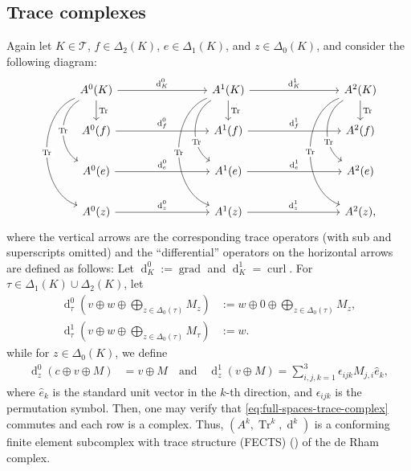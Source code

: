\documentclass{mcom-l}
\theoremstyle{definition}
\theoremstyle{remark}
\numberwithin{equation}{section}
\newcommand{\unitvec}[1]{\hat{#1}}
\DeclareMathOperator{\curl}{curl}
\DeclareMathOperator{\grad}{grad}
\DeclareMathOperator{\dee}{d}
\DeclareMathOperator{\Tr}{Tr}
\newcommand{\mesh}[0]{\mathcal{T}}
\begin{document}
\subsection{Trace complexes}

Again let $K \in \mesh$, $f \in \Delta_2(K)$, 
$e \in \Delta_1(K)$, and $z \in \Delta_0(K)$, and 
consider the following diagram:
\begin{equation}
	\label{eq:full-spaces-trace-complex}
	\begin{tikzcd}[ampersand replacement = \&, column sep = 8em]
		A^0(K) \arrow[r, "\dee_K^0"]
		\arrow[d, "\Tr"]
		\arrow[dd, bend right=60, "\Tr" description]
		\arrow[ddd, bend right=70, "\Tr" description]
		\& A^1(K) \arrow[r, "\dee_K^1"]
		\arrow[d, "\Tr"] 
		\& A^2(K) 
		\arrow[d, "\Tr"] \\
		A^0(f) \arrow[r, "\dee^{0}_{f}"]
		\& A^1(f) \arrow{r}{\dee^{1}_{f}} 
		\& A^2(f) \\
		A^0(e) \arrow{r}{\dee^{0}_{e}}
		\& A^1(e) \arrow{r}{\dee^{1}_{e}} 
		\arrow[from=uu, bend right=60, "\Tr" description, 
		pos=0.66]
		\& A^2(e)
		\arrow[from=uu, bend right=60, "\Tr" description,
		pos=0.66] \\
		A^0(z) \arrow{r}{\dee^{0}_{z}}
		\& A^1(z) \arrow{r}{\dee^{1}_{z}}
		\arrow[from=uuu, bend right=70, "\Tr" description]
		\& A^2(z),
		\arrow[from=uuu, bend right=70, "\Tr" description]
	\end{tikzcd}
\end{equation}
where the vertical arrows are the corresponding trace operators 
(with sub and superscripts omitted) and 
the ``differential'' operators on the horizontal arrows are defined 
as follows: Let $\dee^0_K := \grad$ and $\dee^1_K = \curl$.
For $\tau \in \Delta_1(K) \cup \Delta_2(K)$, let
\begin{align*}
	\dee_{\tau}^0 \left( v \oplus w 
	\oplus \bigoplus_{z \in \Delta_0(\tau)} M_z \right)
	&:= w \oplus 0 
	\oplus \bigoplus_{z \in \Delta_0(\tau)} M_z, \\
	\dee_{\tau}^1 \left( v \oplus w 
	\oplus \bigoplus_{z \in \Delta_0(\tau)} M_{\tau} \right)
	&:= w.
\end{align*}
while for $z \in \Delta_0(K)$, we define 
\begin{align*}
	\dee_z^0 \left( c \oplus v \oplus M \right) &= 
	v \oplus M
	\quad \text{and} \quad 
	\dee_z^1 \left( v \oplus M \right) 
	= \sum_{i, j, k = 1}^{3}\epsilon_{ijk} M_{j, i} \unitvec{e}_k,
\end{align*}
where $\unitvec{e}_k$ is the standard unit vector in the $k$-th direction, and $\epsilon_{ijk}$ is the permutation symbol. Then, one may verify that \cref{eq:full-spaces-trace-complex} commutes
and each row is a complex. Thus, $(A^k, \Tr^k, \dee^k)$  is a conforming 
finite element subcomplex with trace structure (FECTS) 
(\cite[Definition 2.6]{HuLiangLin25}) of the de Rham complex.
\end{document}
